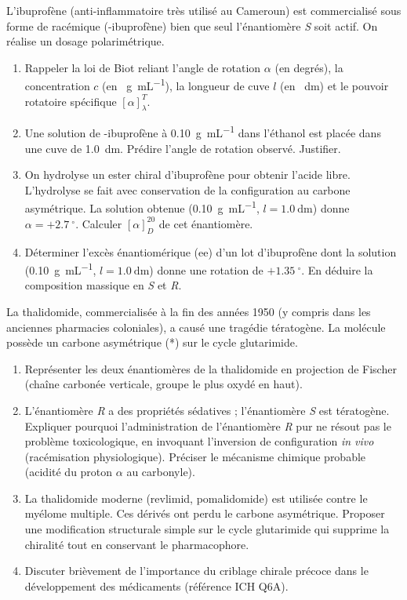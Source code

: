 \documentclass[11pt]{article}
\providecommand{\degree}{^{\circ}}
\begin{document}
\begin{exercice}
L'ibuprofène (anti-inflammatoire très utilisé au Cameroun) est commercialisé sous forme de racémique (-ibuprofène) bien que seul l'énantiomère \textit{S} soit actif. On réalise un dosage polarimétrique.
\begin{enumerate}
    \item Rappeler la loi de Biot reliant l'angle de rotation $\alpha$ (en degrés), la concentration $c$ (en \SI{}{\gram\per\milli\liter}), la longueur de cuve $l$ (en \SI{}{\deci\meter}) et le pouvoir rotatoire spécifique $[\alpha]_\lambda^T$.
    \item Une solution de -ibuprofène à \SI{0.10}{\gram\per\milli\liter} dans l'éthanol est placée dans une cuve de \SI{1.0}{\deci\meter}. Prédire l'angle de rotation observé. Justifier.
    \item On hydrolyse un ester chiral d'ibuprofène pour obtenir l'acide libre. L'hydrolyse se fait avec conservation de la configuration au carbone asymétrique. La solution obtenue (\SI{0.10}{\gram\per\milli\liter}, $l = \SI{1.0}{\deci\meter}$) donne $\alpha = +\SI{2.7}{\degree}$. Calculer $[\alpha]_D^{20}$ de cet énantiomère.
    \item Déterminer l'excès énantiomérique (ee) d'un lot d'ibuprofène dont la solution (\SI{0.10}{\gram\per\milli\liter}, $l = \SI{1.0}{\deci\meter}$) donne une rotation de $+\SI{1.35}{\degree}$. En déduire la composition massique en \textit{S} et \textit{R}.
\end{enumerate}
\end{exercice}

\begin{exercice}
La thalidomide, commercialisée à la fin des années 1950 (y compris dans les anciennes pharmacies coloniales), a causé une tragédie tératogène. La molécule possède un carbone asymétrique (*) sur le cycle glutarimide.
\begin{enumerate}
    \item Représenter les deux énantiomères de la thalidomide en projection de Fischer (chaîne carbonée verticale, groupe le plus oxydé en haut).
    \item L'énantiomère \textit{R} a des propriétés sédatives ; l'énantiomère \textit{S} est tératogène. Expliquer pourquoi l'administration de l'énantiomère \textit{R} pur ne résout pas le problème toxicologique, en invoquant l'inversion de configuration \textit{in vivo} (racémisation physiologique). Préciser le mécanisme chimique probable (acidité du proton $\alpha$ au carbonyle).
    \item La thalidomide moderne (revlimid, pomalidomide) est utilisée contre le myélome multiple. Ces dérivés ont perdu le carbone asymétrique. Proposer une modification structurale simple sur le cycle glutarimide qui supprime la chiralité tout en conservant le pharmacophore.
    \item Discuter brièvement de l'importance du criblage chirale précoce dans le développement des médicaments (référence ICH Q6A).
\end{enumerate}
\end{exercice}
\end{document}
